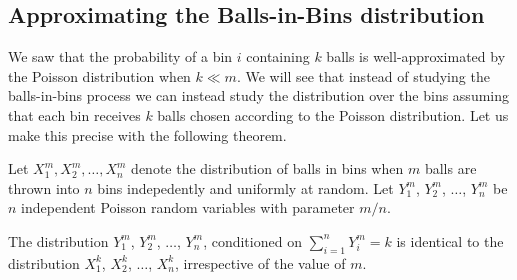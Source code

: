 \subsection{Approximating the Balls-in-Bins distribution}

We saw that the probability of a bin $i$ containing $k$ balls is
well-approximated by the Poisson distribution when $k\ll m$. We will see that
instead of studying the balls-in-bins process we can instead study the
distribution over the bins assuming that each bin receives $k$ balls chosen
according to the Poisson distribution. Let us make this precise with the
following theorem.

\begin{theorem}
  Let $X_1^m, X_2^m, \ldots, X_n^m$ denote the distribution of balls in bins
  when $m$ balls are thrown into $n$ bins indepedently and uniformly at
  random. Let $Y_1^m$, $Y_2^m$, $\ldots$, $Y_n^m$ be $n$ independent Poisson random
  variables with parameter $m/n$.

  The distribution $Y_1^m$, $Y_2^m$, $\ldots$, $Y_n^m$, conditioned on $\sum_{i=1}^n Y_i^m = k$ is identical to the distribution $X_1^k$, $X_2^k$, $\ldots$, $X_n^k$, irrespective of the value of $m$.
  \label{thm:poi-bb-dist}
\end{theorem}
